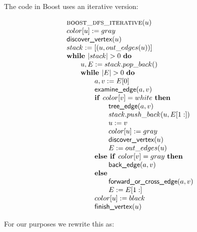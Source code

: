 \documentclass{article}
\newcommand{\Space}{\text{\ }}
\newcommand{\If}{\text{\textbf{if }}}
\newcommand{\Do}{\text{\textbf{do }}}
\newcommand{\Then}{\text{\textbf{then }}}
\newcommand{\Else}{\text{\textbf{else }}}
\newcommand{\While}{\text{\textbf{while }}}
\begin{document}
The code in Boost uses an iterative version:

\[
\begin{tabular}{l}
\textsc{boost\_dfs\_iterative}($u$) \\
$color[u] := gray$ \\
$\textsf{discover\_vertex}(u)$ \\
$stack := [(u, out\_edges(u))]$ \\
$\While |stack| > 0 \Space \Do$ \\
\qquad $u, E := stack.pop\_back()$ \\
\qquad $\While |E| > 0 \Space \Do$ \\
\qquad \qquad $a, v := E[0]$ \\
\qquad \qquad $\textsf{examine\_edge}(a, v)$ \\
\qquad \qquad $\If color[v] = white \Space \Then$ \\
\qquad \qquad \qquad $\textsf{tree\_edge}(a, v)$ \\
\qquad \qquad \qquad $stack.push\_back(u, E[1:])$ \\
\qquad \qquad \qquad $u := v$ \\
\qquad \qquad \qquad $color[u] := gray$ \\
\qquad \qquad \qquad $\textsf{discover\_vertex}(u)$ \\
\qquad \qquad \qquad $E := out\_edges(u)$ \\
\qquad \qquad $\Else \If color[v] = gray \Space \Then$ \\
\qquad \qquad \qquad $\textsf{back\_edge}(a, v)$ \\
\qquad \qquad \Else \\
\qquad \qquad \qquad $\textsf{forward\_or\_cross\_edge}(a, v)$ \\
\qquad \qquad \qquad $E := E[1:]$ \\
\qquad \qquad $color[u] := black$ \\
\qquad \qquad $\textsf{finish\_vertex}(u)$ \\
\end{tabular}
\]

For our purposes we rewrite this as:
\end{document}
